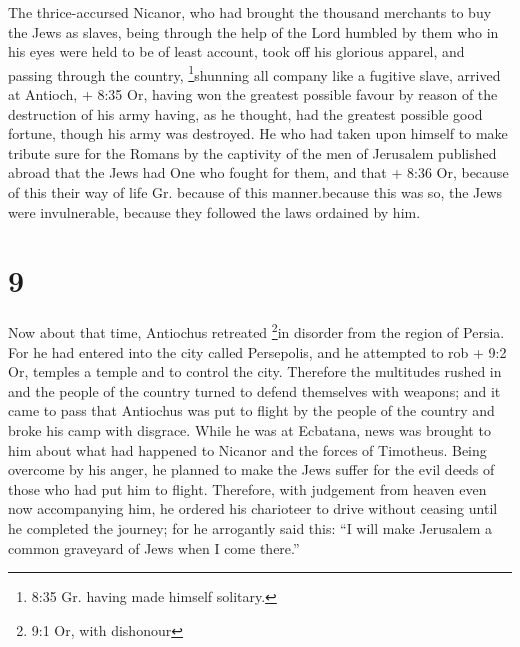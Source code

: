  The thrice-accursed Nicanor, who had brought the thousand
merchants to buy the Jews as slaves,  being through the
help of the Lord humbled by them who in his eyes were held to be of
least account, took off his glorious apparel, and passing through the
country, \footnote{8:35 Gr. having made himself solitary.}shunning all
company like a fugitive slave, arrived at Antioch, + 8:35 Or, having won
the greatest possible favour by reason of the destruction of his army
having, as he thought, had the greatest possible good fortune, though
his army was destroyed.  He who had taken upon himself to
make tribute sure for the Romans by the captivity of the men of
Jerusalem published abroad that the Jews had One who fought for them,
and that + 8:36 Or, because of this their way of life Gr. because of
this manner.because this was so, the Jews were invulnerable, because
they followed the laws ordained by him.

\hypertarget{section-8}{%
\section{9}\label{section-8}}

 Now about that time, Antiochus retreated \footnote{9:1 Or,
  with dishonour}in disorder from the region of Persia.  For
he had entered into the city called Persepolis, and he attempted to rob
+ 9:2 Or, temples a temple and to control the city. Therefore the
multitudes rushed in and the people of the country turned to defend
themselves with weapons; and it came to pass that Antiochus was put to
flight by the people of the country and broke his camp with disgrace.
 While he was at Ecbatana, news was brought to him about
what had happened to Nicanor and the forces of Timotheus. 
Being overcome by his anger, he planned to make the Jews suffer for the
evil deeds of those who had put him to flight. Therefore, with judgement
from heaven even now accompanying him, he ordered his charioteer to
drive without ceasing until he completed the journey; for he arrogantly
said this: ``I will make Jerusalem a common graveyard of Jews when I
come there.''

